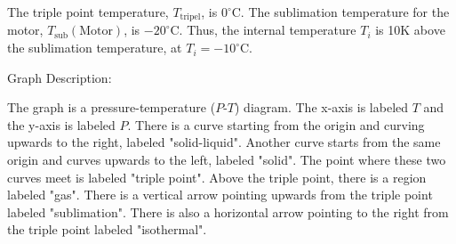 The triple point temperature, \( T_{\text{tripel}} \), is \( 0^\circ \text{C} \).
The sublimation temperature for the motor, \( T_{\text{sub}} (\text{Motor}) \), is \( -20^\circ \text{C} \).
Thus, the internal temperature \( T_i \) is 10K above the sublimation temperature, at \( T_i = -10^\circ \text{C} \).

Graph Description:

The graph is a pressure-temperature (\( P \)-\( T \)) diagram. The x-axis is labeled \( T \) and the y-axis is labeled \( P \). There is a curve starting from the origin and curving upwards to the right, labeled "solid-liquid". Another curve starts from the same origin and curves upwards to the left, labeled "solid". The point where these two curves meet is labeled "triple point". Above the triple point, there is a region labeled "gas". There is a vertical arrow pointing upwards from the triple point labeled "sublimation". There is also a horizontal arrow pointing to the right from the triple point labeled "isothermal".